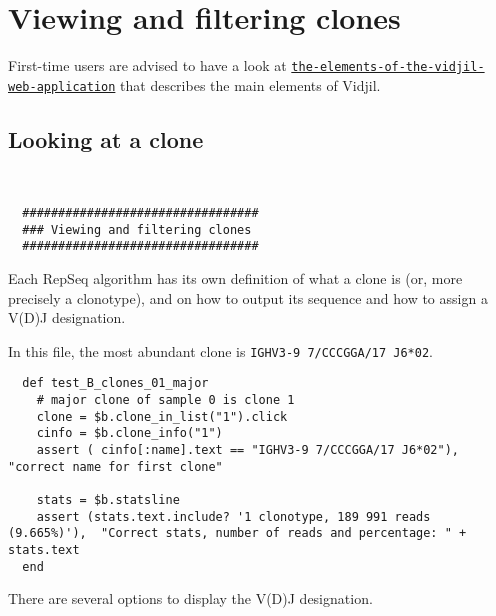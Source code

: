 \section{Viewing and filtering clones}

First-time users are advised to have a look at \href{https://www.vidjil.org/doc/user/#the-elements-of-the-vidjil-web-application}{\tt the-elements-of-the-vidjil-web-application} that describes the main elements of Vidjil.

\subsection{Looking at a clone}
\begin{verbatim}


  #################################
  ### Viewing and filtering clones
  #################################

\end{verbatim}


Each RepSeq algorithm has its own definition of what a clone is (or, more precisely
a clonotype), and on how to output its sequence and how to assign a V(D)J designation.

In this file, the most abundant clone
is \texttt{IGHV3-9 7/CCCGGA/17 J6*02}.



\begin{verbatim}
  def test_B_clones_01_major
    # major clone of sample 0 is clone 1 
    clone = $b.clone_in_list("1").click
    cinfo = $b.clone_info("1")
    assert ( cinfo[:name].text == "IGHV3-9 7/CCCGGA/17 J6*02"), "correct name for first clone"

    stats = $b.statsline
    assert (stats.text.include? '1 clonotype, 189 991 reads (9.665%)'),  "Correct stats, number of reads and percentage: " + stats.text
  end
\end{verbatim}


There are several options to display the V(D)J designation.


